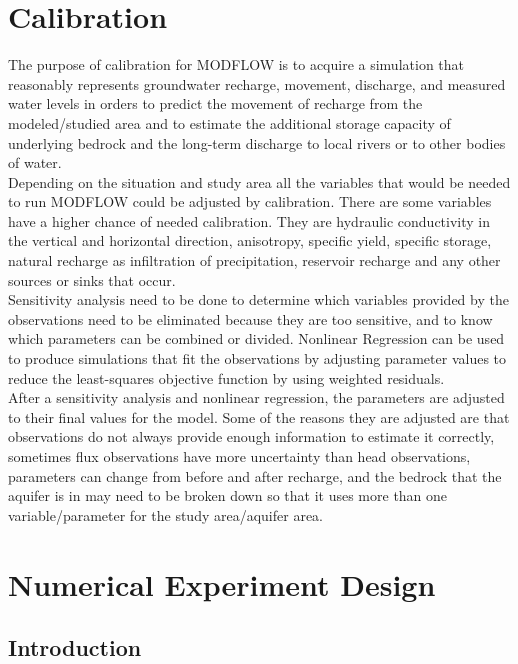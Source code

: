 \documentclass[]{report}
\begin{document}
\chapter{Calibration}
The purpose of calibration for MODFLOW is to acquire a simulation that reasonably represents groundwater recharge, movement, discharge, and measured water levels in orders to predict the movement of recharge from the modeled/studied area and to estimate the additional storage capacity of underlying bedrock and the long-term discharge to local rivers or to other bodies of water. \\
Depending on the situation and study area all the variables that would be needed to run MODFLOW could be adjusted by calibration. There are some variables have a higher chance of needed calibration. They are hydraulic conductivity in the vertical and horizontal direction, anisotropy, specific yield, specific storage, natural recharge as infiltration of precipitation, reservoir recharge and any other sources or sinks that occur.  \\
Sensitivity analysis need to be done to determine which variables provided by the observations need to be eliminated because they are too sensitive, and to know which parameters can be combined or divided. 
Nonlinear Regression can be used to produce simulations that fit the observations by adjusting parameter values to reduce the least-squares objective function by using weighted residuals. \\
After a sensitivity analysis and nonlinear regression, the parameters are adjusted to their final values for the model. Some of the reasons they are adjusted are that observations do not always provide enough information to estimate it correctly, sometimes flux observations have more uncertainty than head observations, parameters can change from before and after recharge, and the bedrock that the aquifer is in may need to be broken down so that it uses more than one variable/parameter for the study area/aquifer area. 

\chapter{Numerical Experiment Design}
\section{Introduction}
\end{document}
